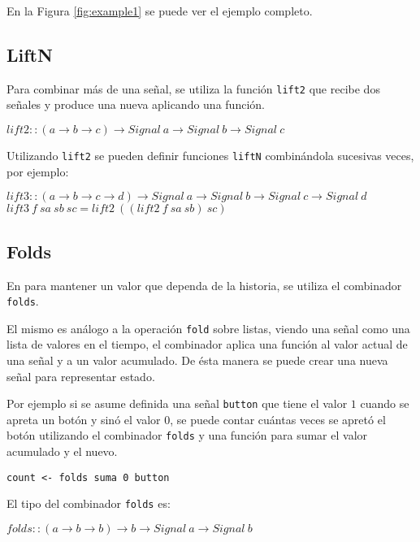   En la Figura \ref{fig:example1} se puede ver el ejemplo completo.



\subsection{LiftN}

  Para combinar más de una señal, se utiliza la función \texttt{lift2}
que recibe dos señales y produce una nueva aplicando una función.

\begin{center}
$lift2 :: (a \rightarrow b \rightarrow c) \rightarrow Signal\ a \rightarrow Signal\ b \rightarrow Signal\ c$
\end{center}

  Utilizando \texttt{lift2} se pueden definir funciones \texttt{liftN}
combinándola sucesivas veces, por ejemplo:

\begin{center}
$lift3 :: (a \rightarrow b \rightarrow c \rightarrow d) \rightarrow Signal\ a \rightarrow Signal\ b \rightarrow Signal\ c \rightarrow Signal\ d$
$lift3\ f\ sa\ sb\ sc = lift2\ ((lift2\ f\ sa\ sb)\ sc)$
\end{center}

\subsection{Folds}

  En \frob{} para mantener un valor que dependa de la historia, se utiliza
el combinador \texttt{folds}.

  El mismo es análogo a la operación \texttt{fold} sobre listas, viendo
una señal como una lista de valores en el tiempo, el combinador aplica una
función al valor actual de una señal y a un valor acumulado.
  De ésta manera se puede crear una nueva señal para representar estado.

  Por ejemplo si se asume definida una señal \texttt{button} que tiene
el valor $1$ cuando se apreta un botón y sinó el valor $0$, se puede
contar cuántas veces se apretó el botón utilizando el combinador \texttt{folds}
y una función para sumar el valor acumulado y el nuevo.

\begin{center}
\begin{Verbatim}[frame=single]
count <- folds suma 0 button
\end{Verbatim}
\end{center}

El tipo del combinador \texttt{folds} es:

\begin{center}
$folds :: (a \rightarrow b \rightarrow b) \rightarrow b \rightarrow Signal\ a \rightarrow Signal\ b$
\end{center}


